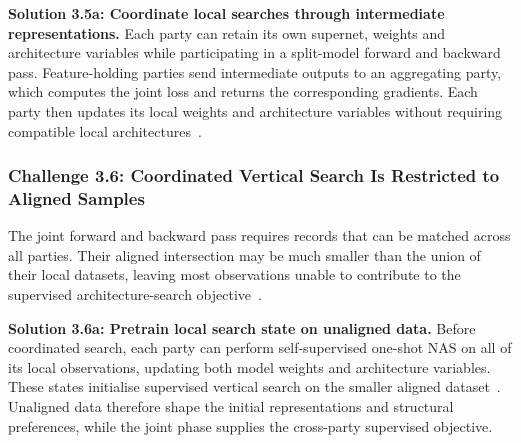 \noindent\textbf{Solution 3.5a: Coordinate local searches through intermediate representations.} Each party can retain its own supernet, weights and architecture variables while participating in a split-model forward and backward pass. Feature-holding parties send intermediate outputs to an aggregating party, which computes the joint loss and returns the corresponding gradients. Each party then updates its local weights and architecture variables without requiring compatible local architectures~\cite{self-supervised_vertical_fednas_2023}.

\subsubsection{Challenge 3.6: Coordinated Vertical Search Is Restricted to Aligned Samples}

The joint forward and backward pass requires records that can be matched across all parties. Their aligned intersection may be much smaller than the union of their local datasets, leaving most observations unable to contribute to the supervised architecture-search objective~\cite{self-supervised_vertical_fednas_2023}.

\noindent\textbf{Solution 3.6a: Pretrain local search state on unaligned data.} Before coordinated search, each party can perform self-supervised one-shot NAS on all of its local observations, updating both model weights and architecture variables. These states initialise supervised vertical search on the smaller aligned dataset~\cite{self-supervised_vertical_fednas_2023}. Unaligned data therefore shape the initial representations and structural preferences, while the joint phase supplies the cross-party supervised objective.

